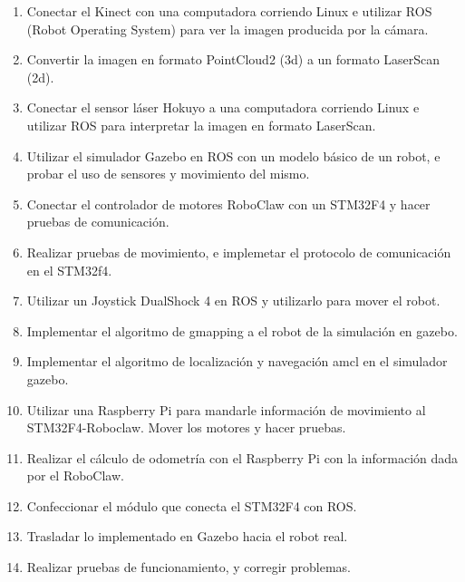 \begin{enumerate}  %
    \item Conectar el Kinect con una computadora corriendo Linux e utilizar ROS (Robot Operating System) para ver la imagen producida por la cámara. 
    \item Convertir la imagen en formato PointCloud2 (3d) a un formato LaserScan (2d).
    \item Conectar el sensor láser Hokuyo a una computadora corriendo Linux e utilizar ROS para interpretar la imagen en formato LaserScan.
    \item Utilizar el simulador Gazebo en ROS con un modelo básico de un robot, e probar el uso de sensores y movimiento del mismo.
    \item Conectar el controlador de motores RoboClaw con un STM32F4 y hacer pruebas de comunicación. 
    \item Realizar pruebas de movimiento, e implemetar el protocolo de comunicación en el STM32f4.
    \item Utilizar un Joystick DualShock 4 en ROS y utilizarlo para mover el robot.
    \item Implementar el algoritmo de gmapping a el robot de la simulación en gazebo. 
    \item Implementar el algoritmo de localización y navegación amcl en el simulador gazebo. 
    \item Utilizar una Raspberry Pi para mandarle información de movimiento al STM32F4-Roboclaw. Mover los motores y hacer pruebas. 
    \item Realizar el cálculo de odometría con el Raspberry Pi con la información dada por el RoboClaw. 
    \item Confeccionar el módulo que conecta el STM32F4 con ROS.
    \item Trasladar lo implementado en Gazebo hacia el robot real.
    \item Realizar pruebas de funcionamiento, y corregir problemas.
\end{enumerate}

